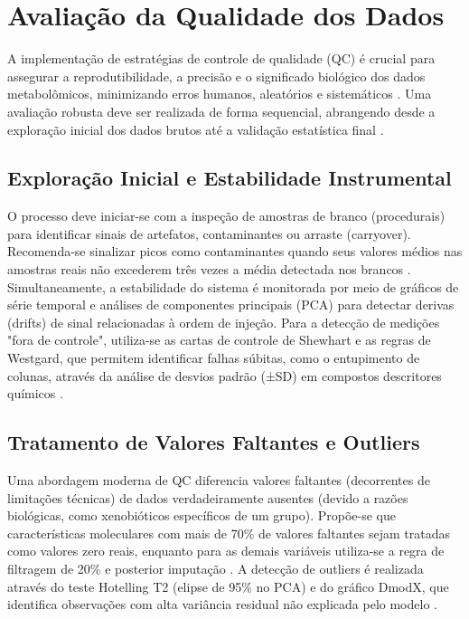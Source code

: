 \section{\textbf{Avaliação da Qualidade dos Dados}}

A implementação de estratégias de controle de qualidade (QC) é crucial para assegurar a reprodutibilidade, a precisão e o significado biológico dos dados metabolômicos, minimizando erros humanos, aleatórios e sistemáticos \cite{QUINTAS2018137, doi:10.1021/acs.analchem.3c03660}. Uma avaliação robusta deve ser realizada de forma sequencial, abrangendo desde a exploração inicial dos dados brutos até a validação estatística final \cite{QUINTAS2018137, doi:10.1021/acs.analchem.3c03660}.

\subsection{Exploração Inicial e Estabilidade Instrumental}

O processo deve iniciar-se com a inspeção de amostras de branco (procedurais) para identificar sinais de artefatos, contaminantes ou arraste (carryover). Recomenda-se sinalizar picos como contaminantes quando seus valores médios nas amostras reais não excederem três vezes a média detectada nos brancos \cite{doi:10.1021/acs.analchem.3c03660}. Simultaneamente, a estabilidade do sistema é monitorada por meio de gráficos de série temporal e análises de componentes principais (PCA) para detectar derivas (drifts) de sinal relacionadas à ordem de injeção. Para a detecção de medições "fora de controle", utiliza-se as cartas de controle de Shewhart e as regras de Westgard, que permitem identificar falhas súbitas, como o entupimento de colunas, através da análise de desvios padrão (±SD) em compostos descritores químicos \cite{doi:10.1021/acs.analchem.3c03660}.

\subsection{Tratamento de Valores Faltantes e Outliers}

Uma abordagem moderna de QC diferencia valores faltantes (decorrentes de limitações técnicas) de dados verdadeiramente ausentes (devido a razões biológicas, como xenobióticos específicos de um grupo). Propõe-se que características moleculares com mais de 70\% de valores faltantes sejam tratadas como valores zero reais, enquanto para as demais variáveis utiliza-se a regra de filtragem de 20\% e posterior imputação \cite{doi:10.1021/acs.analchem.3c03660}. A detecção de outliers é realizada através do teste Hotelling T2 (elipse de 95\% no PCA) e do gráfico DmodX, que identifica observações com alta variância residual não explicada pelo modelo \cite{doi:10.1021/acs.analchem.3c03660}.


